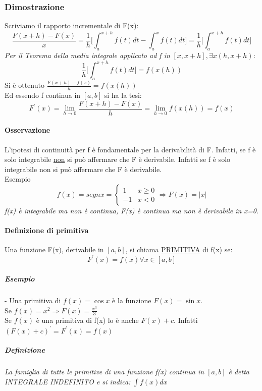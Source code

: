 \subsubsection{Dimostrazione}
Scriviamo il rapporto incrementale di F(x):
\begin{equation*}
	\frac{F(x+h)-F(x)}{x}=\frac{1}{h}\Bigg[\int^{x+h}_a f(t)dt-\int^{x}_a f(t)dt\Bigg]=\frac{1}{h}\Bigg[\int^{x+h}_a f(t)dt\Bigg]
\end{equation*}
\textit{Per il Teorema della media integrale applicato ad f in} $[x,x+h], \exists x (h,x+h)$:
\begin{equation*}
	\frac{1}{h}\Bigg[\int^{x+h}_a f(t)dt\Bigg]=f(x(h))
\end{equation*}
Si è ottenuto $\frac{F(x+h)-f(x)}{h}=f(x(h))$\\
Ed essendo f continua in $[a,b]$ si ha la tesi:
\begin{equation*}
	F^\prime (x)=\lim_{h\to0} \frac{F(x+h)-F(x)}{h}=\lim_{h\to 0} f(x(h))=f(x)
\end{equation*}
\paragraph{Osservazione}
L’ipotesi di continuità per f è fondamentale per la derivabilità di F. Infatti, se f è solo integrabile \underline{non} si può affermare che F è derivabile. Infatti se f è solo integrabile non si può affermare che F è derivabile. \\
Esempio
\begin{equation*}
	f(x)=segn x=\begin{cases}
		1 & x\geq 0\\
		-1 & x<0
	\end{cases}\Rightarrow F(x) =|x|
\end{equation*}
\textit{f(x) è integrabile ma non è continua, F(x) è continua ma non è derivabile in x=0.}
\paragraph{Definizione di primitiva}
Una funzione F(x), derivabile in $[a,b]$, si chiama \underline{PRIMITIVA} di f(x) se:
\begin{equation*}
	F^\prime(x)=f(x) \forall x\in [a,b]
\end{equation*}
\subparagraph{Esempio} - Una primitiva di $f(x)=\cos x$ è la funzione $F(x)=\sin x$.\\
Se $f(x)=x^2\Rightarrow F(x)=\frac{x^3}{3}$\\
Se $f(x)$ è una primitiva di f(x) lo è anche $F(x)+c$. Infatti $(F(x)+c)^\prime=F^\prime(x)=f(x)$\\
\subparagraph{Definizione} \textit{La famiglia di tutte le primitive di una funzione f(x) continua in $[a,b]$ è detta {\color{red} INTEGRALE INDEFINITO} e si indica: }$\int f(x)dx$
